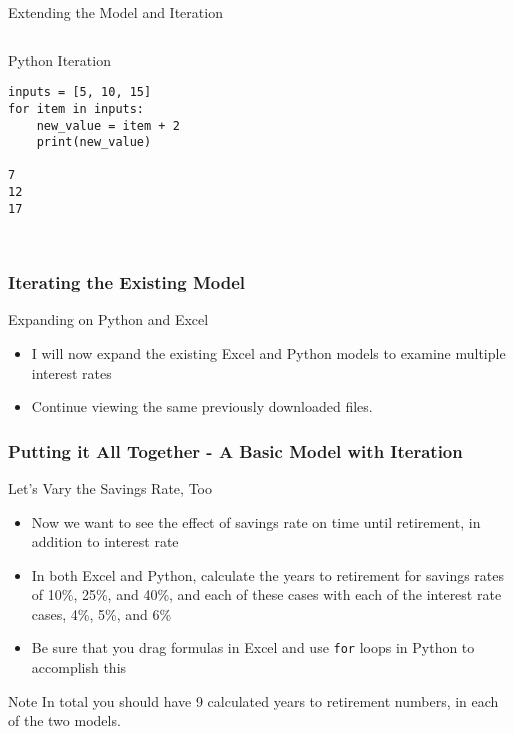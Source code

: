 \documentclass[handout, 11pt]{beamer}
\begin{document}
\begin{section}{Extending the Model and Iteration}
\begin{frame}[fragile]
\begin{columns}
\begin{column}{0.5\textwidth}
{\begin{block}{Python Iteration}
\begin{verbatim}
inputs = [5, 10, 15]
for item in inputs:
    new_value = item + 2
    print(new_value)

7
12
17
        
\end{verbatim}
\end{block}}
\end{column}
\end{columns}
\end{frame}
\begin{frame}
\frametitle{Iterating the Existing Model}
{
\begin{block}{Expanding on Python and Excel}
\begin{itemize}
\item I will now expand the existing Excel and Python models to examine multiple interest rates
\item Continue viewing the same previously downloaded files.
\end{itemize}
\end{block}
}
\end{frame}
\begin{frame}
\frametitle{Putting it All Together - A Basic Model with Iteration}
{
\begin{block}{Let's Vary the Savings Rate, Too}
\begin{itemize}
\item Now we want to see the effect of savings rate on time until retirement, in addition to interest rate
\item In both Excel and Python, calculate the years to retirement for savings rates of 10\%, 25\%, and 40\%, and each of these cases with each of the interest rate cases, 4\%, 5\%, and 6\%
\item Be sure that you drag formulas in Excel and use \texttt{for} loops in Python to accomplish this
\end{itemize}
\vfill
\end{block}
}
\begin{block}{Note}
In total you should have 9 calculated years to retirement numbers, in each of the two models.
\end{block}
\end{frame}
\end{section}
\end{document}
